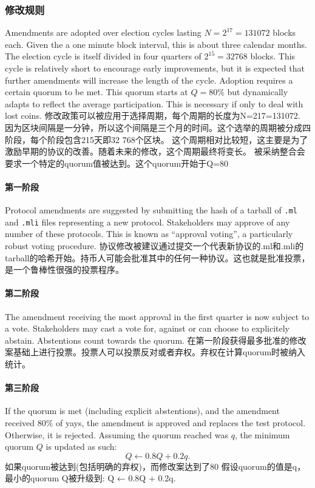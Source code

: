 \documentclass[letterpaper]{article}
\begin{document}
\subsubsection{修改规则}
Amendments are adopted over election cycles lasting $N = 2^{17} = \num{131072}$
blocks each. Given the  a one minute block interval, this is about three
calendar months. The election cycle is itself divided in four quarters of
$2^{15} = \num{32768}$ blocks. This cycle is relatively short to encourage early
improvements, but it is expected that further amendments will increase the
length of the cycle. Adoption requires a certain quorum to be met. This quorum
starts at $Q = 80\%$ but dynamically adapts to reflect the average
participation. This is necessary if only to deal with lost coins.
 修改政策可以被应用于选择周期，每个周期的长度为N=217=131072. 因为区块间隔是一分钟，所以这个间隔是三个月的时间。这个选举的周期被分成四阶段，每个阶段包含215天即32 768个区块。
这个周期相对比较短，这主要是为了激励早期的协议的改善。随着未来的修改，这个周期最终将变长。
被采纳整合会要求一个特定的quorum值被达到。这个quorum开始于Q=80%

\paragraph{第一阶段}
Protocol amendments are suggested by submitting the hash of a tarball of
\verb!.ml! and \verb!.mli! files representing a new protocol. Stakeholders may
approve of any number of these protocols. This is known as ``approval voting'',
a particularly robust voting procedure.
协议修改被建议通过提交一个代表新协议的.ml和.mli的tarball的哈希开始。持币人可能会批准其中的任何一种协议。这也就是批准投票，是一个鲁棒性很强的投票程序。

\paragraph{第二阶段}
The amendment receiving the most approval in the first quarter is now subject to
a vote. Stakeholders may cast a vote for, against or can choose to explicitely
abstain. Abstentions count towards the quorum.
在第一阶段获得最多批准的修改案基础上进行投票。投票人可以投票反对或者弃权。弃权在计算quorum时被纳入统计。

\paragraph{第三阶段} If the quorum is met (including explicit abstentions),
and the amendment received $80\%$ of yays, the amendment is approved and
replaces the test protocol. Otherwise, it is rejected.
Assuming the quorum reached was $q$, the minimum quorum $Q$ is updated as such:
$$Q \leftarrow 0.8 Q + 0.2 q.$$
如果quorum被达到(包括明确的弃权)，而修改案达到了80%
假设quorum的值是q，最小的quorum Q被升级到:
Q ← 0.8Q + 0.2q.
\end{document}
